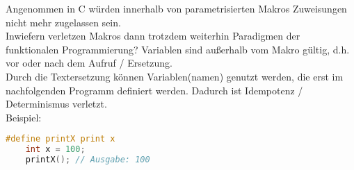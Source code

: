 \begin{card}
	Angenommen in C würden innerhalb von parametrisierten Makros Zuweisungen nicht mehr	zugelassen sein.\\
	Inwiefern verletzen Makros dann trotzdem weiterhin Paradigmen der funktionalen Programmierung?
	\hr
	Variablen sind außerhalb vom Makro gültig, d.h. vor oder nach dem Aufruf / Ersetzung.\\
	Durch die Textersetzung können Variablen(namen) genutzt werden, die erst im nachfolgenden Programm definiert werden. Dadurch ist Idempotenz / Determinismus verletzt.\\
	Beispiel:
	\begin{lstlisting}[language=C]
	#define printX print x
	int x = 100;
	printX(); // Ausgabe: 100
	\end{lstlisting}
\end{card}
